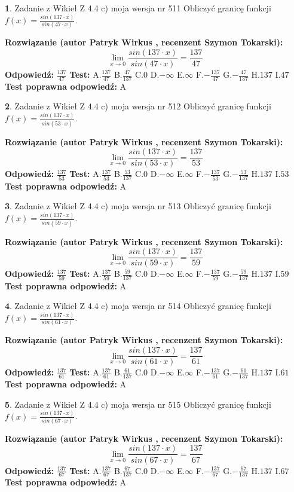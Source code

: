 \documentclass[12pt, a4paper]{article}
\theoremstyle{definition} %
\newtheorem{zad}{}
\newcommand{\zadStart}[1]{\begin{zad}#1\newline}
\newcommand{\zadStop}{\end{zad}}
\newcommand{\rozwStart}[2]{\noindent \textbf{Rozwiązanie (autor #1 , recenzent #2): }\newline}
\newcommand{\rozwStop}{\newline}
\newcommand{\odpStart}{\noindent \textbf{Odpowiedź:}\newline}
\newcommand{\odpStop}{\newline}
\newcommand{\testStart}{\noindent \textbf{Test:}\newline}
\newcommand{\testStop}{\newline}
\newcommand{\kluczStart}{\noindent \textbf{Test poprawna odpowiedź:}\newline}
\newcommand{\kluczStop}{\newline}
\begin{document}
\zadStart{Zadanie z Wikieł Z 4.4 c) moja wersja nr 511}
Obliczyć granicę funkcji $f(x)=\frac{sin(137\cdot x)}{sin(47\cdot x)}$.
\zadStop
\rozwStart{Patryk Wirkus}{Szymon Tokarski}
$$\lim\limits_{x\to 0}\frac{sin(137\cdot x)}{sin(47\cdot x)}=
\frac{137}{47}$$
\rozwStop
\odpStart
$\frac{137}{47}$
\odpStop
\testStart
A.$\frac{137}{47}$
B.$\frac{47}{137}$
C.$0$
D.$-\infty$
E.$\infty$
F.$-\frac{137}{47}$
G.$-\frac{47}{137}$
H.$137$
I.$47$
\testStop
\kluczStart
A
\kluczStop



\zadStart{Zadanie z Wikieł Z 4.4 c) moja wersja nr 512}
Obliczyć granicę funkcji $f(x)=\frac{sin(137\cdot x)}{sin(53\cdot x)}$.
\zadStop
\rozwStart{Patryk Wirkus}{Szymon Tokarski}
$$\lim\limits_{x\to 0}\frac{sin(137\cdot x)}{sin(53\cdot x)}=
\frac{137}{53}$$
\rozwStop
\odpStart
$\frac{137}{53}$
\odpStop
\testStart
A.$\frac{137}{53}$
B.$\frac{53}{137}$
C.$0$
D.$-\infty$
E.$\infty$
F.$-\frac{137}{53}$
G.$-\frac{53}{137}$
H.$137$
I.$53$
\testStop
\kluczStart
A
\kluczStop



\zadStart{Zadanie z Wikieł Z 4.4 c) moja wersja nr 513}
Obliczyć granicę funkcji $f(x)=\frac{sin(137\cdot x)}{sin(59\cdot x)}$.
\zadStop
\rozwStart{Patryk Wirkus}{Szymon Tokarski}
$$\lim\limits_{x\to 0}\frac{sin(137\cdot x)}{sin(59\cdot x)}=
\frac{137}{59}$$
\rozwStop
\odpStart
$\frac{137}{59}$
\odpStop
\testStart
A.$\frac{137}{59}$
B.$\frac{59}{137}$
C.$0$
D.$-\infty$
E.$\infty$
F.$-\frac{137}{59}$
G.$-\frac{59}{137}$
H.$137$
I.$59$
\testStop
\kluczStart
A
\kluczStop



\zadStart{Zadanie z Wikieł Z 4.4 c) moja wersja nr 514}
Obliczyć granicę funkcji $f(x)=\frac{sin(137\cdot x)}{sin(61\cdot x)}$.
\zadStop
\rozwStart{Patryk Wirkus}{Szymon Tokarski}
$$\lim\limits_{x\to 0}\frac{sin(137\cdot x)}{sin(61\cdot x)}=
\frac{137}{61}$$
\rozwStop
\odpStart
$\frac{137}{61}$
\odpStop
\testStart
A.$\frac{137}{61}$
B.$\frac{61}{137}$
C.$0$
D.$-\infty$
E.$\infty$
F.$-\frac{137}{61}$
G.$-\frac{61}{137}$
H.$137$
I.$61$
\testStop
\kluczStart
A
\kluczStop



\zadStart{Zadanie z Wikieł Z 4.4 c) moja wersja nr 515}
Obliczyć granicę funkcji $f(x)=\frac{sin(137\cdot x)}{sin(67\cdot x)}$.
\zadStop
\rozwStart{Patryk Wirkus}{Szymon Tokarski}
$$\lim\limits_{x\to 0}\frac{sin(137\cdot x)}{sin(67\cdot x)}=
\frac{137}{67}$$
\rozwStop
\odpStart
$\frac{137}{67}$
\odpStop
\testStart
A.$\frac{137}{67}$
B.$\frac{67}{137}$
C.$0$
D.$-\infty$
E.$\infty$
F.$-\frac{137}{67}$
G.$-\frac{67}{137}$
H.$137$
I.$67$
\testStop
\kluczStart
A
\kluczStop
\end{document}

